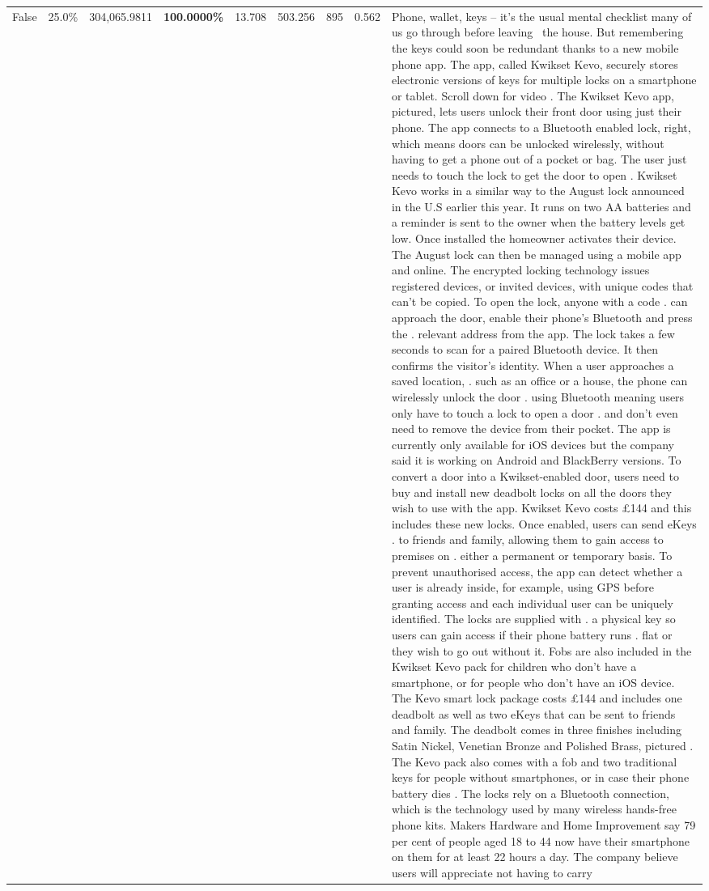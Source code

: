 \begin{table}[H]
\begin{tabular}{lllrlllll}
False & 25.0\% & \color{red} 304,065.9811 & \bfseries \color{red} 100.0000\% & 13.708 & 503.256 & 895 & 0.562 & Phone, wallet, keys – it’s the usual mental checklist many of us go through before leaving  the house. But remembering the keys could soon be redundant thanks to a new mobile phone app. The app, called Kwikset Kevo, securely stores electronic versions of keys for multiple locks on a smartphone or tablet. Scroll down for video . The Kwikset Kevo app, pictured, lets users unlock their front door using just their phone. The app connects to a Bluetooth enabled lock, right, which means doors can be unlocked wirelessly, without having to get a phone out of a pocket or bag. The user just needs to touch the lock to get the door to open . Kwikset Kevo works in a similar way to the August lock announced in the U.S earlier this year. It runs on two AA batteries and a reminder is sent to the owner when the battery levels get low. Once installed the homeowner activates their device. The August lock can then be managed using a mobile app and online. The encrypted locking technology issues registered devices, or invited devices, with unique codes that can't be copied. To open the lock, anyone with a code . can approach the door, enable their phone's Bluetooth and press the . relevant address from the app. The lock takes a few seconds to scan for a paired Bluetooth device. It then confirms the visitor's identity. When a user approaches a saved location, . such as an office or a house, the phone can wirelessly unlock the door . using Bluetooth meaning users only have to touch a lock to open a door . and don't even need to remove the device from their pocket. The app is currently only available for iOS devices but the company said it is working on Android and BlackBerry versions. To convert a door into a Kwikset-enabled door, users need to buy and install new deadbolt locks on all the doors they wish to use with the app. Kwikset Kevo costs £144 and this includes these new locks. Once enabled, users can send eKeys . to friends and family, allowing them to gain access to premises on . either a permanent or temporary basis. To prevent unauthorised access, the app can detect whether a user is already inside, for example, using GPS before granting access and each individual user can be uniquely identified. The locks are supplied with . a physical key so users can gain access if their phone battery runs . flat or they wish to go out without it. Fobs are also included in the Kwikset Kevo pack for children who don't have a smartphone, or for people who don't have an iOS device. The Kevo smart lock package costs £144 and includes one deadbolt as well as two eKeys that can be sent to friends and family. The deadbolt comes in three finishes including Satin Nickel, Venetian Bronze and Polished Brass, pictured . The Kevo pack also comes with a fob and two traditional keys for people without smartphones, or in case their phone battery dies . The locks rely on a Bluetooth connection, which is the technology used by many wireless hands-free phone kits. Makers Hardware and Home Improvement say 79 per cent of people aged 18 to 44 now have their smartphone on them for at least 22 hours a day. The company believe users will appreciate not having to carry 
\end{tabular}
\end{table}
